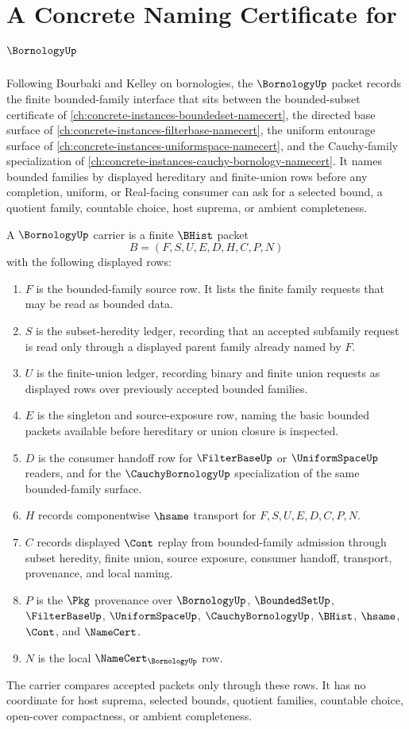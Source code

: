 \chapter{A Concrete Naming Certificate for $\BornologyUp$}
\label{ch:concrete-instances-bornology-namecert}

Following Bourbaki and Kelley on bornologies, the $\BornologyUp$ packet records the finite bounded-family interface that sits between the bounded-subset certificate of \autoref{ch:concrete-instances-boundedset-namecert}, the directed base surface of \autoref{ch:concrete-instances-filterbase-namecert}, the uniform entourage surface of \autoref{ch:concrete-instances-uniformspace-namecert}, and the Cauchy-family specialization of \autoref{ch:concrete-instances-cauchy-bornology-namecert}. It names bounded families by displayed hereditary and finite-union rows before any completion, uniform, or Real-facing consumer can ask for a selected bound, a quotient family, countable choice, host suprema, or ambient completeness.

\begin{definition}
\label{def:bornology-carrier}
A $\BornologyUp$ carrier is a finite $\BHist$ packet
$$
B=(F,S,U,E,D,H,C,P,N)
$$
with the following displayed rows:
\begin{enumerate}
\item $F$ is the bounded-family source row. It lists the finite family requests that may be read as bounded data.
\item $S$ is the subset-heredity ledger, recording that an accepted subfamily request is read only through a displayed parent family already named by $F$.
\item $U$ is the finite-union ledger, recording binary and finite union requests as displayed rows over previously accepted bounded families.
\item $E$ is the singleton and source-exposure row, naming the basic bounded packets available before hereditary or union closure is inspected.
\item $D$ is the consumer handoff row for $\FilterBaseUp$ or $\UniformSpaceUp$ readers, and for the $\CauchyBornologyUp$ specialization of the same bounded-family surface.
\item $H$ records componentwise $\hsame$ transport for $F,S,U,E,D,C,P,N$.
\item $C$ records displayed $\Cont$ replay from bounded-family admission through subset heredity, finite union, source exposure, consumer handoff, transport, provenance, and local naming.
\item $P$ is the $\Pkg$ provenance over $\BornologyUp$, $\BoundedSetUp$, $\FilterBaseUp$, $\UniformSpaceUp$, $\CauchyBornologyUp$, $\BHist$, $\hsame$, $\Cont$, and $\NameCert$.
\item $N$ is the local $\NameCert_{\BornologyUp}$ row.
\end{enumerate}
The carrier compares accepted packets only through these rows. It has no coordinate for host suprema, selected bounds, quotient families, countable choice, open-cover compactness, or ambient completeness.
\end{definition}

